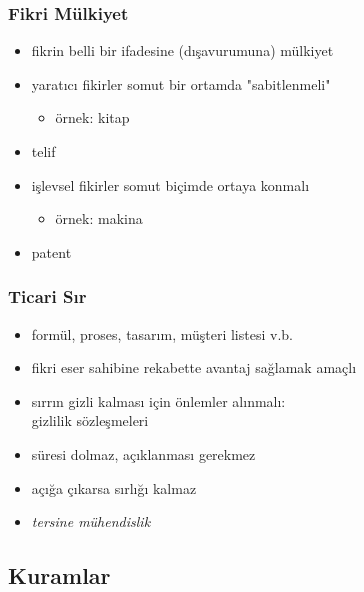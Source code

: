 \documentclass[dvipsnames]{beamer}
\theoremstyle{definition}
\theoremstyle{example}
\theoremstyle{plain}
\begin{document}
\begin{frame}
  \frametitle{Fikri Mülkiyet}

  \begin{itemize}
    \item fikrin belli bir ifadesine (dışavurumuna) mülkiyet

    \pause
    \medskip
    \item yaratıcı fikirler somut bir ortamda "sabitlenmeli"
    \begin{itemize}
      \item örnek: kitap
    \end{itemize}
    \item \alert{telif}

    \pause
    \medskip
    \item işlevsel fikirler somut biçimde ortaya konmalı
    \begin{itemize}
      \item örnek: makina
    \end{itemize}
    \item \alert{patent}
  \end{itemize}
\end{frame}

\begin{frame}
  \frametitle{Ticari Sır}

  \begin{itemize}
    \item formül, proses, tasarım, müşteri listesi v.b.
    \item fikri eser sahibine rekabette avantaj sağlamak amaçlı
    \item sırrın gizli kalması için önlemler alınmalı:\\
      gizlilik sözleşmeleri

    \pause
    \medskip
    \item süresi dolmaz, açıklanması gerekmez
    \item açığa çıkarsa sırlığı kalmaz

    \pause
    \medskip
    \item \emph{tersine mühendislik}
  \end{itemize}
\end{frame}

\subsection{Kuramlar}
\end{document}
